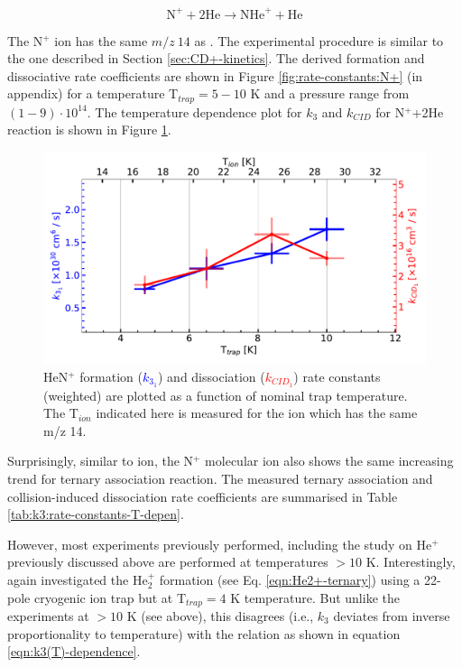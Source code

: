 \[ \text{N}^+ + 2\text{He} \rightarrow \text{NHe}^+ + \text{He}\]

The N$^+$ ion has the same $m/z\ 14$ as \CD. The experimental procedure is
similar to the one described in Section \ref{sec:CD+-kinetics}. The derived
formation and dissociative rate coefficients are shown in Figure
\ref{fig:rate-constants:N+} (in appendix) for a temperature T$_{trap}=5-10$ K
and a pressure range from $(1 - 9 ) \cdot 10^{14}$\percc. The temperature
dependence plot for $k_3$ and $k_{CID}$ for N$^+$+2He reaction is shown in
Figure \ref{fig:HeN+:rate-constants-f(t)}.

\begin{figure}[!htb]
    \centering
    \includegraphics[width=1\textwidth]{figures/measurements/kinetics/functionOf_T/N+/off_k3_kCID_as_functionOfT_with_Tcol.pdf}
    \caption{HeN$^+$ formation (\textcolor{blue}{$k_{3_1}$}) and dissociation (\textcolor{red}{$k_{CID_1}$}) rate constants (weighted) are plotted as a function of nominal trap temperature. The T$_{ion}$ indicated here is measured for the \CD ion which has the same m/z 14.}
    \label{fig:HeN+:rate-constants-f(t)}
\end{figure}


Surprisingly, similar to \CD ion, the N$^+$ molecular ion also shows the same increasing trend for ternary association reaction. The measured ternary association and collision-induced dissociation rate coefficients are summarised in Table \ref{tab:k3:rate-constants-T-depen}.

However, most experiments previously performed, including the study on He$^+$
previously discussed above are performed at temperatures $>10$ K.
Interestingly, \citet{gerlich_infrared_2018} again investigated the He$_2^+$
formation (see Eq. \ref{eqn:He2+-ternary}) using a 22-pole cryogenic ion trap
but at T$_{trap}=4$ K temperature. But unlike the experiments at $>10$ K (see
above), this disagrees (i.e., $k_3$ deviates from inverse proportionality to temperature) with the
relation as shown in equation \ref{eqn:k3(T)-dependence}.

